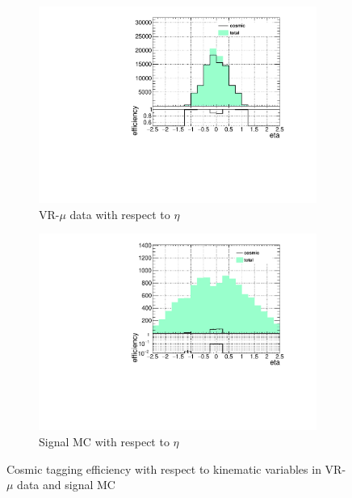 \begin{figure}[!ht]
 \begin{subfigure}[b]{0.4\textwidth}
  	\includegraphics[width=\textwidth]{figures/cosmics/wider_tag_ratio_eta.pdf}
  	\caption{VR-$\mu$ data with respect to $\eta$}
  \end{subfigure}
  \begin{subfigure}[b]{0.4\textwidth}
  	\includegraphics[width=\textwidth]{figures/cosmics/mc_300_ratio_eta.pdf}
  	\caption{Signal \ac{MC} with respect to $\eta$}
  \end{subfigure}
    \caption{Cosmic tagging efficiency with respect to kinematic variables in VR-$\mu$ data and signal \ac{MC}}
  \label{fig:cos_eff}
\end{figure}




